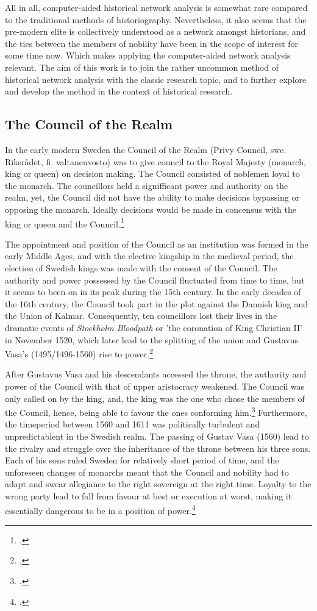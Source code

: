 All in all, computer-aided historical network analysis is somewhat rare compared to the traditional methods of historiography. Nevertheless, it also seems that the pre-modern elite is collectively understood as a network amongst historians, and the ties between the members of nobility have been in the scope of interest for some time now. Which makes applying the computer-aided network analysis relevant. The aim of this work is to join the rather uncommon method of historical network analysis with the classic research topic, and to further explore and develop the method in the context of historical research.

\subsection{The Council of the Realm}
In the early modern Sweden the Council of the Realm (Privy Council, swe. Riksrådet, fi. valtaneuvosto) was to give council to the Royal Majesty (monarch, king or queen) on decision making. The Council consisted of noblemen loyal to the monarch. The councillors held a signifficant power and authority on the realm, yet, the Council did not have the ability to make decisions bypassing or opposing the monarch. Ideally decisions would be made in concensus with the king or queen and the Council.\footcites[p. 13-14,]{hopesAndFearsIntro}[p. 47-50.]{HakanenAKoskinen2017}

The appointment and position of the Council as an institution was formed in the early Middle Ages, and with the elective kingship in the medieval period, the election of Swedish kings was made with the consent of the Council. The authority and power possessed by the Council fluctuated from time to time, but it seems to been on in its peak during the 15th century. In the early decades of the 16th century, the Council took part in the plot against the Dannish king and the Union of Kalmar. Consequently, ten councillors lost their lives in the dramatic events of \textit{Stockholm Bloodpath} or 'the coronation of King Christian II' in November 1520, which later lead to the splitting of the union and Gustavus Vasa's (1495/1496-1560) rise to power.\footcite[p. 49-50.]{HakanenAKoskinen2017}

After Gustavus Vasa and his descendants accessed the throne, the authority and power of the Council with that of upper aristocracy weakened. The Council was only called on by the king, and, the king was the one who chose the members of the Council, hence, being able to favour the ones conforming him.\footcite[p. 58.]{pSuurvalta} Furthermore, the timeperiod between 1560 and 1611 was politically turbulent and unpredictablent in the Swedish realm. The passing of Gustav Vasa (1560) lead to the rivalry and struggle over the inheritance of the throne between his three sons. Each of his sons ruled Sweden for relatively short period of time, and the unforeseen changes of monarchs meant that the Council and nobility had to adapt and swear allegiance to the right sovereign at the right time. Loyalty to the wrong party lead to fall from favour at best or execution at worst, making it essentially dangerous to be in a position of power.\footcite[p. 96-121.]{pSuurvalta}

